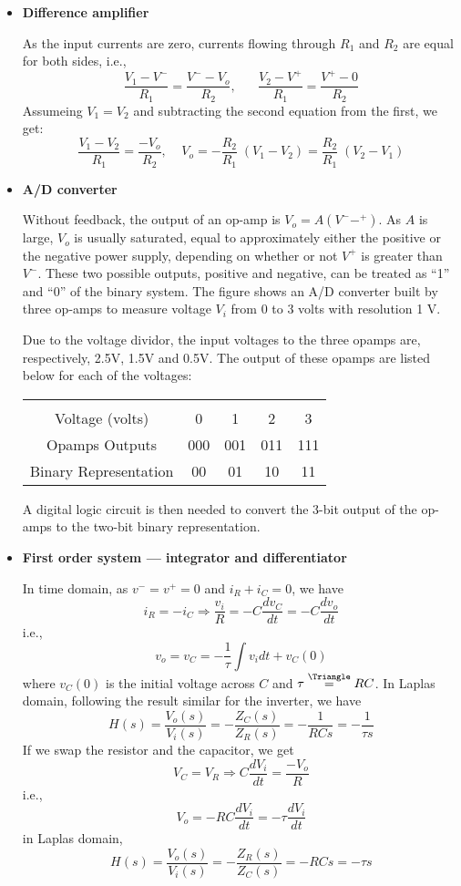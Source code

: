 \begin{itemize}
\item {\bf Difference amplifier}

As the input currents are zero, currents flowing through $R_1$ and $R_2$
are equal for both sides, i.e.,
\[	\frac{V_1-V^-}{R_1}=\frac{V^--V_o}{R_2},\;\;\;\;\;\;
	\frac{V_2-V^+}{R_1}=\frac{V^+-0}{R_2}		\]
Assumeing $V_1=V_2$ and subtracting the second equation from the first, 
we get:
\[	\frac{V_1-V_2}{R_1}=\frac{-V_o}{R_2},\;\;\;\;
	V_o=-\frac{R_2}{R_1}\;(V_1-V_2)=\frac{R_2}{R_1}\;(V_2-V_1)	\]

\item {\bf A/D converter}

Without feedback, the output of an op-amp is $V_o=A(V^--^+)$. As $A$ is
large, $V_o$ is usually saturated, equal to approximately either the 
positive or the negative power supply, depending on whether or not $V^+$ 
is greater than $V^-$. These two possible outputs, positive and negative,
can be treated as ``1'' and ``0'' of the binary system. The figure shows
an A/D converter built by three op-amps to measure voltage $V_i$ from 0 to 
3 volts with resolution 1 V.


Due to the voltage dividor, the input voltages to the three opamps are, 
respectively, 2.5V, 1.5V and 0.5V. The output of these opamps are listed
below for each of the voltages:

\begin{tabular}{c|cccc}\hline \\
Voltage (volts) & 0 	& 1	& 2	& 3	\\
Opamps Outputs	& 000	& 001	& 011	& 111	\\
Binary Representation	& 00	& 01	& 10	& 11	\\ \hline
\end{tabular}
A digital logic circuit is then needed to convert the 3-bit output
of the op-amps to the two-bit binary representation.

\item {\bf First order system --- integrator and differentiator}


In time domain, as $v^-=v^+=0$ and $i_R+i_C=0$, we have
\[	i_R=-i_C \Longrightarrow \frac{v_i}{R}=-C\frac{d v_C}{dt}
	=-C\frac{d v_o}{dt}	\]
i.e.,
\[	v_o=v_C=-\frac{1}{\tau} \int v_i dt+v_C(0)	\]
where $v_C(0)$ is the initial voltage across $C$ and 
$\tau\stackrel{\Triangle}{=}RC$. In Laplas domain, following the result
similar for the inverter, we have
\[
H(s)=\frac{V_o(s)}{V_i(s)}=-\frac{Z_C(s)}{Z_R(s)}=-\frac{1}{RCs}
	=-\frac{1}{\tau s}	\]
If we swap the resistor and the capacitor, we get
\[	V_C=V_R \Longrightarrow C\frac{d V_i}{dt}=\frac{-V_o}{R}	\]
i.e.,
\[	V_o=-RC \frac{d V_i}{dt}=-\tau \frac{d V_i}{dt}	\]
in Laplas domain,
\[
	H(s)=\frac{V_o(s)}{V_i(s)}=-\frac{Z_R(s)}{Z_C(s)}=-RCs=-\tau s	\]


\end{itemize}
